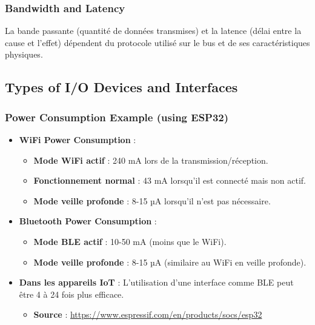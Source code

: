 \documentclass[10pt,a4paper]{article}
\begin{document}
\subsubsection*{Bandwidth and Latency}
La bande passante (quantité de données transmises) et la latence (délai entre la cause et l'effet) dépendent du protocole utilisé sur le bus et de ses caractéristiques physiques.

\subsection*{Types of I/O Devices and Interfaces}

\subsubsection*{Power Consumption Example (using ESP32)}
\begin{itemize}
    \item \textbf{WiFi Power Consumption} :
    \begin{itemize}
        \item \textbf{Mode WiFi actif} : 240 mA lors de la transmission/réception.
        \item \textbf{Fonctionnement normal} : 43 mA lorsqu'il est connecté mais non actif.
        \item \textbf{Mode veille profonde} : 8-15 µA lorsqu'il n'est pas nécessaire.
    \end{itemize}
    \item \textbf{Bluetooth Power Consumption} :
    \begin{itemize}
        \item \textbf{Mode BLE actif} : 10-50 mA (moins que le WiFi).
        \item \textbf{Mode veille profonde} : 8-15 µA (similaire au WiFi en veille profonde).
    \end{itemize}
    \item \textbf{Dans les appareils IoT} : L'utilisation d'une interface comme BLE peut être 4 à 24 fois plus efficace.
    \begin{itemize}
        \item \textbf{Source} : \url{https://www.espressif.com/en/products/socs/esp32}
    \end{itemize}
\end{itemize}
\end{document}
